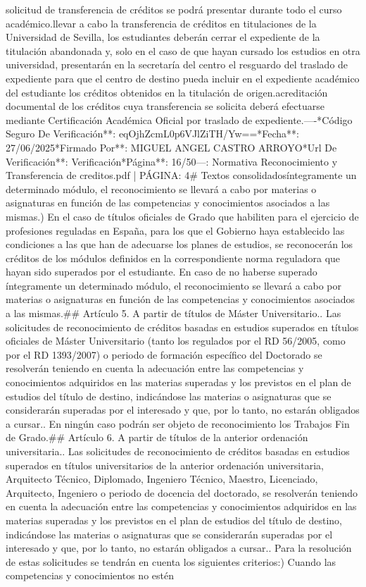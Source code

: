 \documentclass{article}
\begin{document}
\begin{itemize}
{{solicitud de transferencia de créditos se podrá presentar durante todo el curso académico.\n\nPara llevar a cabo la transferencia de créditos en titulaciones de la Universidad de Sevilla, los estudiantes deberán cerrar el expediente de la titulación abandonada y, solo en el caso de que hayan cursado los estudios en otra universidad, presentarán en la secretaría del centro el resguardo del traslado de expediente para que el centro de destino pueda incluir en el expediente académico del estudiante los créditos obtenidos en la titulación de origen.\n\nLa acreditación documental de los créditos cuya transferencia se solicita deberá efectuarse mediante Certificación Académica Oficial por traslado de expediente.\n\n----\n\n**Código Seguro De Verificación**: eqOjhZcmL0p6VJlZiTH/Yw==\n**Fecha**: 27/06/2025\n**Firmado Por**: MIGUEL ANGEL CASTRO ARROYO\n**Url De Verificación**: Verificación\n**Página**: 16/50\n\n---\n\nFUENTE: Normativa Reconocimiento y Transferencia de creditos.pdf | PÁGINA: 4\n# Textos consolidados\n\nsuperado íntegramente un determinado módulo, el reconocimiento se llevará a cabo por materias o asignaturas en función de las competencias y conocimientos asociados a las mismas.\n{}) En el caso de títulos oficiales de Grado que habiliten para el ejercicio de profesiones reguladas en España, para los que el Gobierno haya establecido las condiciones a las que han de adecuarse los planes de estudios, se reconocerán los créditos de los módulos definidos en la correspondiente norma reguladora que hayan sido superados por el estudiante. En caso de no haberse superado íntegramente un determinado módulo, el reconocimiento se llevará a cabo por materias o asignaturas en función de las competencias y conocimientos asociados a las mismas.\n\n## Artículo 5. A partir de títulos de Máster Universitario.\n{}. Las solicitudes de reconocimiento de créditos basadas en estudios superados en títulos oficiales de Máster Universitario (tanto los regulados por el RD 56/2005, como por el RD 1393/2007) o periodo de formación específico del Doctorado se resolverán teniendo en cuenta la adecuación entre las competencias y conocimientos adquiridos en las materias superadas y los previstos en el plan de estudios del título de destino, indicándose las materias o asignaturas que se considerarán superadas por el interesado y que, por lo tanto, no estarán obligados a cursar.\n{}. En ningún caso podrán ser objeto de reconocimiento los Trabajos Fin de Grado.\n\n## Artículo 6. A partir de títulos de la anterior ordenación universitaria.\n{}. Las solicitudes de reconocimiento de créditos basadas en estudios superados en títulos universitarios de la anterior ordenación universitaria, Arquitecto Técnico, Diplomado, Ingeniero Técnico, Maestro, Licenciado, Arquitecto, Ingeniero o periodo de docencia del doctorado, se resolverán teniendo en cuenta la adecuación entre las competencias y conocimientos adquiridos en las materias superadas y los previstos en el plan de estudios del título de destino, indicándose las materias o asignaturas que se considerarán superadas por el interesado y que, por lo tanto, no estarán obligados a cursar.\n{}. Para la resolución de estas solicitudes se tendrán en cuenta los siguientes criterios:\n{}) Cuando las competencias y conocimientos no estén }}
\end{itemize}
\end{document}
